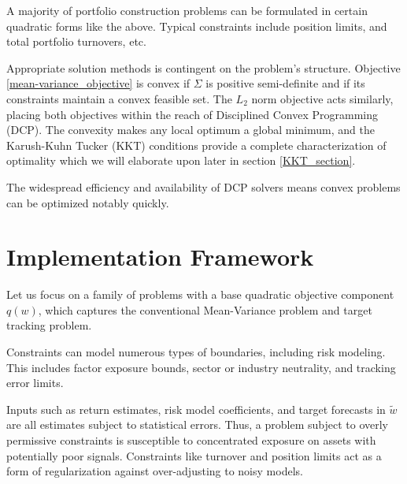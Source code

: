 \documentclass[11pt, letterpaper]{article}
\begin{document}
A majority of portfolio construction problems can be formulated in certain quadratic forms like the above. Typical constraints
include position limits, and total portfolio turnovers, etc.

Appropriate solution methods is contingent on the problem's structure. Objective \eqref{mean-variance_objective} is convex
if $\Sigma$ is positive semi-definite and if its constraints maintain a convex feasible set.
The $L_2$ norm objective acts similarly, placing both objectives within the reach of
Disciplined Convex Programming (DCP). The convexity makes any local optimum a global minimum,
and the Karush-Kuhn Tucker (KKT) conditions provide a complete characterization of optimality which
we will elaborate upon later in section \ref{KKT_section}.

The widespread efficiency and availability of DCP solvers means convex problems can be optimized
notably quickly.



\section{Implementation Framework}

Let us focus on a family of problems with a base quadratic objective component $q(w)$, which captures the conventional Mean-Variance
problem and target tracking problem.

Constraints can model numerous types of boundaries, including risk modeling. This includes factor exposure bounds,
sector or industry neutrality, and tracking error limits.

Inputs such as return estimates, risk model coefficients, and target forecasts in $\tilde{w}$ are all estimates subject to
statistical errors. Thus, a problem subject to overly permissive constraints is susceptible to concentrated exposure on assets
with potentially poor signals. Constraints like turnover and position limits act as a form of regularization against
over-adjusting to noisy models.
\end{document}

